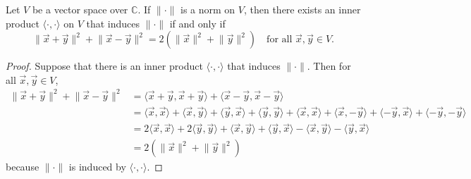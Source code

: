 \documentclass{homework}
\begin{document}
	\maketitle
	
	\question Let $V$ be a vector space over $\mathbb{C}$. If $\lVert \cdot \rVert$ is a norm on $V$, then there exists an inner product $\langle \cdot, \cdot\rangle$ on $V$ that induces $\lVert \cdot \rVert$ if and only if
	\begin{equation}
		\label{eq:parallelogram}
		\lVert \vec{x} + \vec{y} \rVert^2 + \lVert \vec{x} - \vec{y}\rVert^2 = 2(\lVert \vec{x}\rVert^2 + \lVert \vec{y}\rVert^2) \quad \text{for all $\vec{x}, \vec{y}\in V$.}
	\end{equation}
	
	\begin{proof}
		Suppose that there is an inner product $\langle\cdot, \cdot\rangle$ that induces $\lVert\cdot\rVert$. Then for all $\vec{x},\vec{y}\in V$,
		\begin{equation*}
		\begin{aligned}
			\lVert \vec{x} +\vec{y}\rVert^2 + \lVert \vec{x} - \vec{y}\rVert^2 &= \langle\vec{x}+\vec{y},\vec{x}+ \vec{y}\rangle + \langle\vec{x}-\vec{y},\vec{x}-\vec{y}\rangle  \\
			&= \langle\vec{x},\vec{x}\rangle  + \langle\vec{x},\vec{y}\rangle + \langle\vec{y},\vec{x}\rangle +  \langle\vec{y},\vec{y}\rangle + \langle\vec{x},\vec{x}\rangle +\langle\vec{x},-\vec{y}\rangle + \langle-\vec{y},\vec{x}\rangle + \langle-\vec{y},-\vec{y}\rangle \\
			&= 2\langle\vec{x},\vec{x}\rangle + 2\langle\vec{y},\vec{y}\rangle + \langle\vec{x},\vec{y}\rangle + \langle\vec{y},\vec{x}\rangle - \langle\vec{x},\vec{y}\rangle - \langle\vec{y},\vec{x}\rangle \\
			&= 2(\lVert\vec{x}\rVert^2 + \lVert\vec{y}\rVert^2)
		\end{aligned}
		\end{equation*}
		because $\lVert\cdot\rVert$ is induced by $\langle\cdot,\cdot\rangle$.
		

\end{proof}
\end{document}
